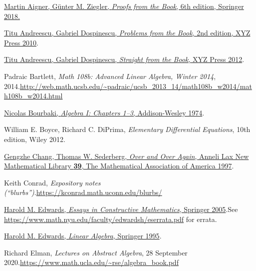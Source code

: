 \documentclass[numbers=enddot,12pt,final,onecolumn,notitlepage]{scrartcl}%
\numberwithin{exer}{subsection}
\theoremstyle{definition}
\begin{document}
\begin{thebibliography}{99999999}                                                                                         %


%
\href{https://doi.org/10.1007/978-3-662-57265-8}{Martin Aigner, G\"{u}nter M.
Ziegler, \textit{Proofs from the Book}, 6th edition, Springer 2018.}

\href{https://bookstore.ams.org/xyz-13}{Titu
Andreescu, Gabriel Dospinescu, \textit{Problems from the Book}, 2nd edition,
XYZ Press 2010}.

\href{https://bookstore.ams.org/xyz-6}{Titu
Andreescu, Gabriel Dospinescu, \textit{Straight from the Book}, XYZ Press
2012}.

Padraic Bartlett, \textit{Math 108b: Advanced
Linear Algebra, Winter 2014}, 2014.\newline\url{http://web.math.ucsb.edu/~padraic/ucsb_2013_14/math108b_w2014/math108b_w2014.html}

%
\href{http://libgen.rs/book/index.php?md5=3270565F6D0052635A1550883588204C}{Nicolas
Bourbaki, \textit{Algebra I: Chapters 1--3}, Addison-Wesley 1974}.

William E. Boyce, Richard C. DiPrima,
\textit{Elementary Differential Equations}, 10th edition, Wiley 2012.

%
\href{https://www.jstor.org/stable/10.4169/j.ctt19b9mbq}{Gengzhe Chang, Thomas
W. Sederberg, \textit{Over and Over Again}, Anneli Lax New Mathematical
Library \textbf{39}, The Mathematical Association of America 1997}.

Keith Conrad, \textit{Expository notes
(\textquotedblleft blurbs\textquotedblright)}.\newline\url{https://kconrad.math.uconn.edu/blurbs/}

%
\href{https://doi.org/10.1007/b138656}{Harold M. Edwards, \textit{Essays in
Constructive Mathematics}, Springer 2005}.\newline See
\url{https://www.math.nyu.edu/faculty/edwardsh/eserrata.pdf} for errata.

%
\href{https://doi.org/10.1007/978-0-8176-4446-8}{Harold M. Edwards,
\textit{Linear Algebra}, Springer 1995}.

Richard Elman, \textit{Lectures on Abstract
Algebra}, 28 September 2020.\newline\url{https://www.math.ucla.edu/~rse/algebra_book.pdf}


\end{thebibliography}
\end{document}

